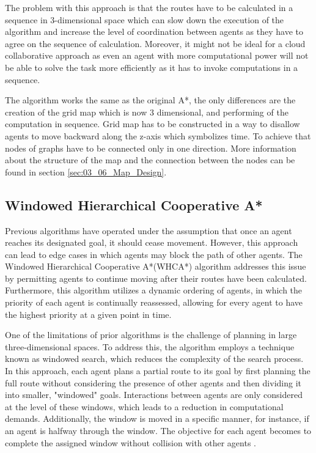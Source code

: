 The problem with this approach is that the routes have to be calculated in a sequence in 3-dimensional space which can slow down the execution of the algorithm and increase the level of coordination between agents as they have to agree on the sequence of calculation. Moreover, it might not be ideal for a cloud collaborative approach as even an agent with more computational power will not be able to solve the task more efficiently as it has to invoke computations in a sequence.

The algorithm works the same as the original A*, the only differences are the creation of the grid map which is now 3 dimensional, and  performing of the computation in sequence. Grid map has to be constructed in a way to disallow agents to move backward along the z-axis which symbolizes time. To achieve that nodes of graphs have to be connected only in one direction. More information about the structure of the map and the connection between the nodes can be found in section \ref{sec:03_06_Map_Design}.

\subsection{Windowed Hierarchical Cooperative A*}
Previous algorithms have operated under the assumption that once an agent reaches its designated goal, it should cease movement. However, this approach can lead to edge cases in which agents may block the path of other agents. The Windowed Hierarchical Cooperative A*(WHCA*) algorithm addresses this issue by permitting agents to continue moving after their routes have been calculated. Furthermore, this algorithm utilizes a dynamic ordering of agents, in which the priority of each agent is continually reassessed, allowing for every agent to have the highest priority at a given point in time.

One of the limitations of prior algorithms is the challenge of planning in large three-dimensional spaces. To address this, the algorithm employs a technique known as windowed search, which reduces the complexity of the search process. In this approach, each agent plans a partial route to its goal by first planning the full route without considering the presence of other agents and then dividing it into smaller, "windowed" goals. Interactions between agents are only considered at the level of these windows, which leads to a reduction in computational demands. Additionally, the window is moved in a specific manner, for instance, if an agent is halfway through the window. The objective for each agent becomes to complete the assigned window without collision with other agents \cite{whca}\cite{path_adv}.

